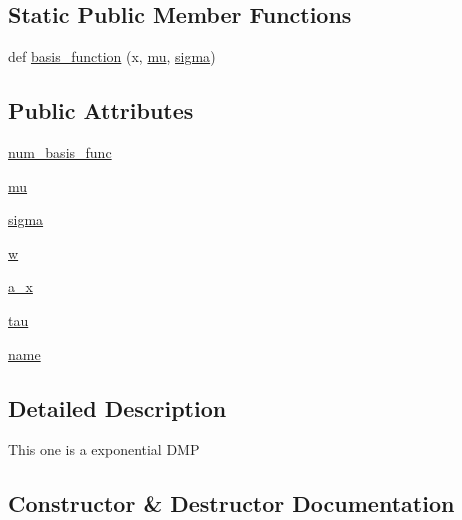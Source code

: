 \subsection*{Static Public Member Functions}
\begin{DoxyCompactItemize}
\item 
def \hyperlink{classtaxons_1_1core_1_1evolution_1_1genome_1_1_d_m_p_exp_a244d3ce0486f6aeb78c71ae8436a522a}{basis\+\_\+function} (x, \hyperlink{classtaxons_1_1core_1_1evolution_1_1genome_1_1_d_m_p_exp_a07afa40aaebd0b83a4bd7ba4f63b3d46}{mu}, \hyperlink{classtaxons_1_1core_1_1evolution_1_1genome_1_1_d_m_p_exp_a01531009179404318fe377fcca3c29fc}{sigma})
\end{DoxyCompactItemize}
\subsection*{Public Attributes}
\begin{DoxyCompactItemize}
\item 
\hyperlink{classtaxons_1_1core_1_1evolution_1_1genome_1_1_d_m_p_exp_a0d16c122836321b854949429a0c8b518}{num\+\_\+basis\+\_\+func}
\item 
\hyperlink{classtaxons_1_1core_1_1evolution_1_1genome_1_1_d_m_p_exp_a07afa40aaebd0b83a4bd7ba4f63b3d46}{mu}
\item 
\hyperlink{classtaxons_1_1core_1_1evolution_1_1genome_1_1_d_m_p_exp_a01531009179404318fe377fcca3c29fc}{sigma}
\item 
\hyperlink{classtaxons_1_1core_1_1evolution_1_1genome_1_1_d_m_p_exp_a105f7eb18bb41917dd3da9dd462a8092}{w}
\item 
\hyperlink{classtaxons_1_1core_1_1evolution_1_1genome_1_1_d_m_p_exp_a1957e1176586de85b767cb9ff56ba6d1}{a\+\_\+x}
\item 
\hyperlink{classtaxons_1_1core_1_1evolution_1_1genome_1_1_d_m_p_exp_a04174eb5fe6a6e786ddbfaf0e7caeb05}{tau}
\item 
\hyperlink{classtaxons_1_1core_1_1evolution_1_1genome_1_1_d_m_p_exp_a11ab58d138a2a1aac8a2bac2e89fa964}{name}
\end{DoxyCompactItemize}


\subsection{Detailed Description}
\begin{DoxyVerb}This one is a exponential DMP
\end{DoxyVerb}
 

\subsection{Constructor \& Destructor Documentation}
